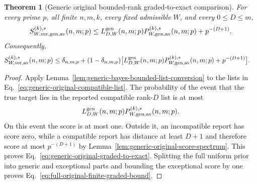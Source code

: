 \documentclass[11pt]{article}
\newcommand{\1}{\mathbf 1}
\theoremstyle{plain}
\newtheorem{theorem}{Theorem}[section]
\theoremstyle{definition}
\theoremstyle{remark}
\begin{document}
\begin{theorem}[Generic original bounded-rank graded-to-exact comparison]
\label{thm:generic-original-bounded-rank-graded-to-exact}
For every prime $p$, all finite $n,m,k$, every fixed admissible $W$, and every
$0\le D\le m$,
\begin{equation}
 S_{W,\rm ver,gen,av}^{(k),*}(n,m;p)
 \le L_{D,W}^{\mathrm{gen}}(n,m;p)
 P_{W,\rm gen,av}^{(k),*}(n,m;p)+p^{-(D+1)}.
 \label{eq:generic-original-graded-to-exact}
\end{equation}
Consequently,
\begin{align}
 S_{W,\rm ver,av}^{(k),*}(n,m;p)
 &\le\delta_{n,m,p}+(1-\delta_{n,m,p})
 \bigl[L_{D,W}^{\mathrm{gen}}(n,m;p)
 P_{W,\rm gen,av}^{(k),*}(n,m;p)+p^{-(D+1)}\bigr].
 \label{eq:full-original-finite-graded-bound}
\end{align}
\end{theorem}
\begin{proof}
Apply Lemma~\ref{lem:generic-bayes-bounded-list-conversion} to the lists in
Eq.~\eqref{eq:generic-original-compatible-list}.  The probability of the
event that the true target lies in the reported compatible rank-$D$ list is at
most
\begin{equation}
 L_{D,W}^{\mathrm{gen}}(n,m;p)
 P_{W,\rm gen,av}^{(k),*}(n,m;p).
 \label{eq:generic-original-low-rank-event-bound}
\end{equation}
On this event the score is at most one.  Outside it, an incompatible report
has score zero, while a compatible report has distance at least $D+1$ and
therefore score at most $p^{-(D+1)}$ by
Lemma~\ref{lem:generic-original-score-spectrum}.  This proves
Eq.~\eqref{eq:generic-original-graded-to-exact}.  Splitting the full uniform
prior into generic and exceptional parts and bounding the exceptional score by
one proves Eq.~\eqref{eq:full-original-finite-graded-bound}.
\end{proof}
\end{document}

